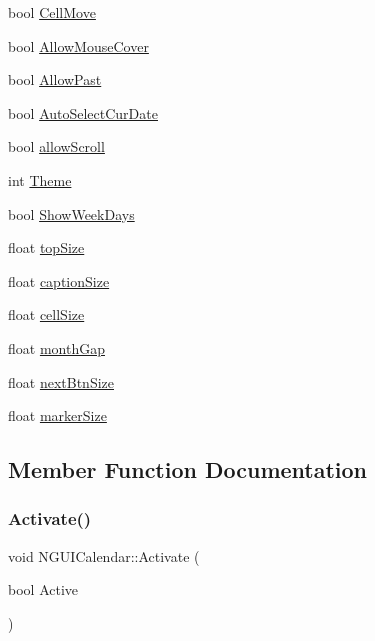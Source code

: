\begin{DoxyCompactItemize}
\item 
bool \hyperlink{class_n_g_u_i_calendar_afc39d4c0840f22c2697729a339015ccc}{Cell\+Move}
\item 
bool \hyperlink{class_n_g_u_i_calendar_a04874d9a6ec96bac43a6c42d6493724b}{Allow\+Mouse\+Cover}
\item 
bool \hyperlink{class_n_g_u_i_calendar_aafa53a225f268ca1adac35d2d974afe1}{Allow\+Past}
\item 
bool \hyperlink{class_n_g_u_i_calendar_a6b4be4d2c4f29d35a4e52476f0a3f98d}{Auto\+Select\+Cur\+Date}
\item 
bool \hyperlink{class_n_g_u_i_calendar_a3d039004ac9007622764798041539d56}{allow\+Scroll}
\item 
int \hyperlink{class_n_g_u_i_calendar_a3e38bf8420871db2bea3329d3e949a32}{Theme}
\item 
bool \hyperlink{class_n_g_u_i_calendar_ab4f8e7b2ff0426273cbaec1134d895ba}{Show\+Week\+Days}
\item 
float \hyperlink{class_n_g_u_i_calendar_adbb13997ae9d0236bcb133cc1c6e5ff9}{top\+Size}
\item 
float \hyperlink{class_n_g_u_i_calendar_ac6aaf0ec60a1466c07f8446646772709}{caption\+Size}
\item 
float \hyperlink{class_n_g_u_i_calendar_a49f670bdde897375c98c40d347f7ab04}{cell\+Size}
\item 
float \hyperlink{class_n_g_u_i_calendar_a808f00ca813783ca64e8947a7f144da0}{month\+Gap}
\item 
float \hyperlink{class_n_g_u_i_calendar_a4630d053a58db306b6650b7330b53583}{next\+Btn\+Size}
\item 
float \hyperlink{class_n_g_u_i_calendar_a0abe69ad0da82b6ec0d3c563fbfd238e}{marker\+Size}
\end{DoxyCompactItemize}


\subsection{Member Function Documentation}
\hypertarget{class_n_g_u_i_calendar_af04ef224369ac711a7590db57ee0066f}{}\label{class_n_g_u_i_calendar_af04ef224369ac711a7590db57ee0066f} 
\subsubsection{\texorpdfstring{Activate()}{Activate()}}
{\footnotesize\ttfamily void N\+G\+U\+I\+Calendar\+::\+Activate (\begin{DoxyParamCaption}\item[{bool}]{Active }\end{DoxyParamCaption})}


